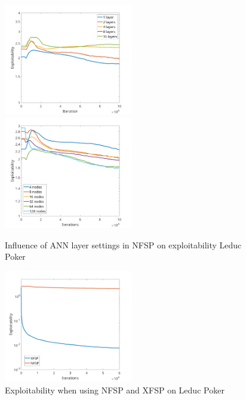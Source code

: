 \documentclass[10pt,a4paper]{article}
\begin{document}
\begin{center}
\begin{figure}[h]
\label{fig:layers_kuhn}
\includegraphics[width=0.5\textwidth]{Figures/leduc_layers.png}
\includegraphics[width=0.5\textwidth]{Figures/leduc_nodes.png}
\caption{Influence of ANN layer settings in NFSP on exploitability Leduc Poker}
\end{figure}
\end{center}


\begin{center}
	\begin{figure}[h]
	\centering
	\label{fig:layers_kuhn}
	\includegraphics[width=0.5\textwidth]{Figures/xfsp_nfsp_leduc.png}
	\caption{Exploitability when using NFSP and XFSP on Leduc Poker}
	\end{figure}
	\end{center}
\end{document}
